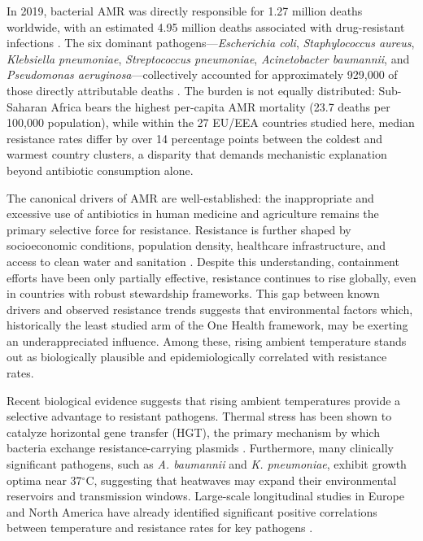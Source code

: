 \documentclass[11pt,a4paper]{article}
\begin{document}
In 2019, bacterial AMR was directly responsible for 1.27 million deaths worldwide, with an estimated 4.95 million deaths associated with drug-resistant infections \cite{murray2022global, Ni2025BMCInfectDis}. The six dominant pathogens---\textit{Escherichia coli}, \textit{Staphylococcus aureus}, \textit{Klebsiella pneumoniae}, \textit{Streptococcus pneumoniae}, \textit{Acinetobacter baumannii}, and \textit{Pseudomonas aeruginosa}---collectively accounted for approximately 929,000 of those directly attributable deaths \cite{murray2022global, zambrano2022annrevgenet}. The burden is not equally distributed: Sub-Saharan Africa bears the highest per-capita AMR mortality (23.7 deaths per 100,000 population), while within the 27 EU/EEA countries studied here, median resistance rates differ by over 14 percentage points between the coldest and warmest country clusters, a disparity that demands mechanistic explanation beyond antibiotic consumption alone.

The canonical drivers of AMR are well-established: the inappropriate and excessive use of antibiotics in human medicine and agriculture remains the primary selective force for resistance. Resistance is further shaped by socioeconomic conditions, population density, healthcare infrastructure, and access to clean water and sanitation \cite{Ni2025BMCInfectDis}. Despite this understanding, containment efforts have been only partially effective, resistance continues to rise globally, even in countries with robust stewardship frameworks. This gap between known drivers and observed resistance trends suggests that environmental factors which, historically the least studied arm of the One Health framework, may be exerting an underappreciated influence. Among these, rising ambient temperature stands out as biologically plausible and epidemiologically correlated with resistance rates.

Recent biological evidence suggests that rising ambient temperatures provide a selective advantage to resistant pathogens. Thermal stress has been shown to catalyze horizontal gene transfer (HGT), the primary mechanism by which bacteria exchange resistance-carrying plasmids \cite{jhm2023, lancetPlanetaryHealth2026}. Furthermore, many clinically significant pathogens, such as \textit{A. baumannii} and \textit{K. pneumoniae}, exhibit growth optima near 37$^\circ$C, suggesting that heatwaves may expand their environmental reservoirs and transmission windows. Large-scale longitudinal studies in Europe and North America have already identified significant positive correlations between temperature and resistance rates for key pathogens \cite{Kaba2020, mcgough2020rates, Ni2025BMCInfectDis}.
\end{document}
